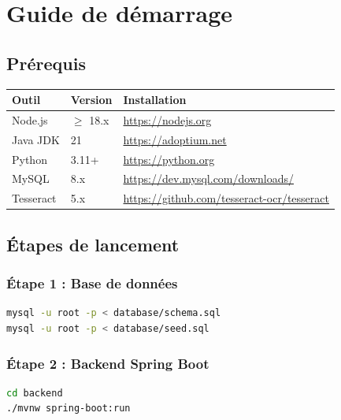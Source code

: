 \documentclass[a4paper,12pt]{report}
\begin{document}
\chapter{Guide de démarrage}

\section{Prérequis}

\begin{center}
\begin{tabularx}{\textwidth}{|l|l|X|}
\hline
\textbf{Outil} & \textbf{Version} & \textbf{Installation} \\
\hline
Node.js & $\geq$ 18.x & \url{https://nodejs.org} \\
\hline
Java JDK & 21 & \url{https://adoptium.net} \\
\hline
Python & 3.11+ & \url{https://python.org} \\
\hline
MySQL & 8.x & \url{https://dev.mysql.com/downloads/} \\
\hline
Tesseract & 5.x & \url{https://github.com/tesseract-ocr/tesseract} \\
\hline
\end{tabularx}
\end{center}

\section{Étapes de lancement}

\subsection{Étape 1 : Base de données}
\begin{lstlisting}[language=bash,title={Initialisation MySQL}]
mysql -u root -p < database/schema.sql
mysql -u root -p < database/seed.sql
\end{lstlisting}

\subsection{Étape 2 : Backend Spring Boot}
\begin{lstlisting}[language=bash,title={Lancement du backend (port 8080)}]
cd backend
./mvnw spring-boot:run
\end{lstlisting}
\end{document}
